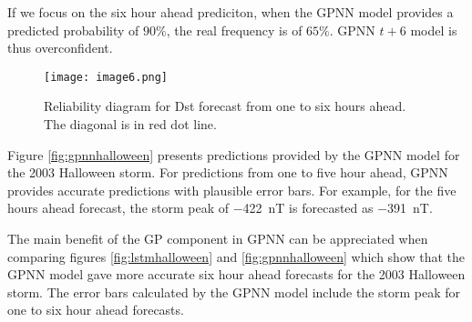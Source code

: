 If we focus on the six hour ahead prediciton, when the GPNN model provides a predicted probability of $90\%$, the 
real frequency is of $65\%$. GPNN $t+6$ model is thus overconfident. 



\begin{figure}
	\texttt{[image: image6.png]}
	\caption{Reliability diagram for Dst forecast from one to six hours ahead. The diagonal is in red dot line.}
	\label{fig:gpnnreliability}
\end{figure}




Figure \ref{fig:gpnnhalloween} presents predictions provided by the GPNN model for the 2003 Halloween storm. 
For predictions from one to five hour ahead, GPNN provides accurate predictions with plausible error bars. 
For example, for the five hours ahead forecast, the storm peak of \SI{-422}{\nano\tesla} is forecasted as 
\SI{-391}{\nano\tesla}. 

The main benefit of the GP component in GPNN can be appreciated when comparing figures \ref{fig:lstmhalloween} 
and \ref{fig:gpnnhalloween} which show that the GPNN model gave more accurate six hour ahead forecasts for the 
2003 Halloween storm. The error bars calculated by the GPNN model include the storm peak for one to six hour 
ahead forecasts.

